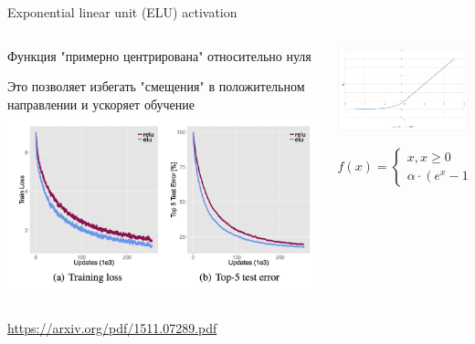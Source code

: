 \documentclass[notes,12pt, aspectratio=169]{beamer}
\newenvironment{wideitemize}{\itemize\addtolength{\itemsep}{10pt}}{\enditemize}
\begin{document}
\begin{frame}{Exponential linear unit (ELU) activation}
\begin{columns}
	\begin{column}{0.6\textwidth}
		\begin{center}	
		\begin{wideitemize}
			\item Функция "примерно центрирована" относительно нуля
			\item Это позволяет избегать "смещения" в положительном направлении и ускоряет обучение 
		\end{wideitemize}
			\includegraphics[width=.7\linewidth]{elu_loss.png}
	\end{center}
	\end{column}
	\hfill
	\begin{column}{0.4\textwidth}
			\includegraphics[width=.8\linewidth]{elu.png}
			
			$$
			f(x) = \begin{cases} x,  x \ge 0 \\ \alpha \cdot (e^x - 1),  x < 0 \end{cases}
			$$
	\end{column}
\end{columns}

\vfill %
\footnotesize
{\color{blue} \url{https://arxiv.org/pdf/1511.07289.pdf}}
\end{frame}
\end{document}
